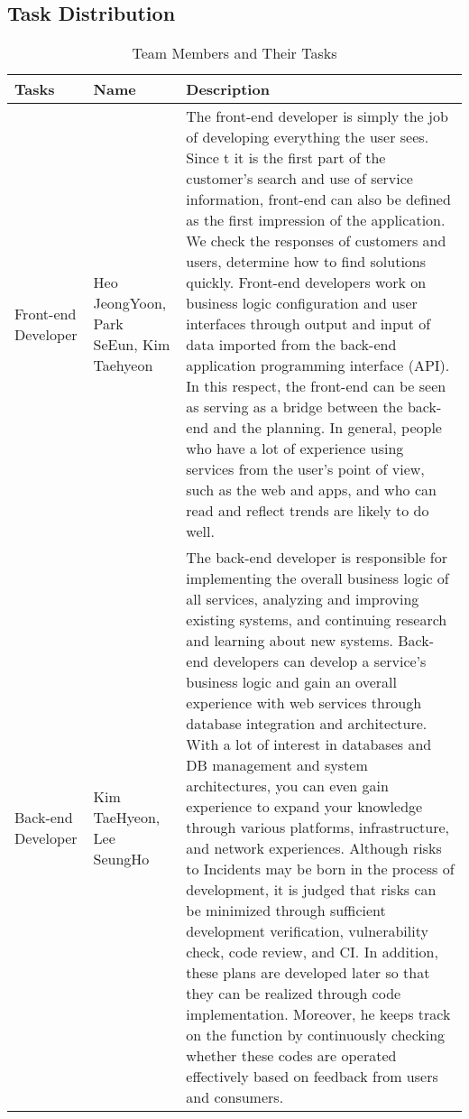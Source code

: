 \documentclass[conference]{IEEEtran}
\begin{document}
\subsection{Task Distribution}
\begin{table}[htbp]
\caption{Team Members and Their Tasks}
\begin{tabular}{| p{1cm}|p{1.5cm}|p{5.2cm} |}

\hline
Tasks & Name & Description\\

\hline
Front-end Developer & Heo JeongYoon, Park SeEun, Kim Taehyeon & The front-end developer is simply the job of developing everything the user sees. Since t it is the first part of the customer's search and use of service information, front-end can also be defined as the first impression of the application. We check the responses of customers and users, determine how to find solutions quickly.
Front-end developers work on business logic configuration and user interfaces through output and input of data imported from the back-end application programming interface (API). In this respect, the front-end can be seen as serving as a bridge between the back-end and the planning.
In general, people who have a lot of experience using services from the user's point of view, such as the web and apps, and who can read and reflect trends are likely to do well.\\

\hline
Back-end Developer & Kim TaeHyeon, Lee SeungHo & The back-end developer is responsible for implementing the overall business logic of all services, analyzing and improving existing systems, and continuing research and learning about new systems. Back-end developers can develop a service's business logic and gain an overall experience with web services through database integration and architecture. With a lot of interest in databases and DB management and system architectures, you can even gain experience to expand your knowledge through various platforms, infrastructure, and network experiences. Although risks to Incidents may be born in the process of development, it is judged that risks can be minimized through sufficient development verification, vulnerability check, code review, and CI. In addition, these plans are developed later so that they can be realized through code implementation. Moreover, he keeps track on the function by continuously checking whether these codes are operated effectively based on feedback from users and consumers.\\


\end{tabular}
\end{table}
\end{document}
